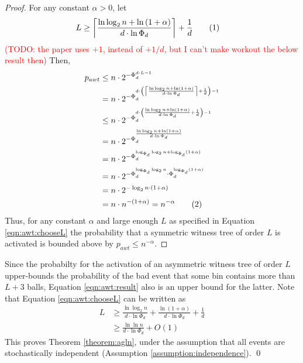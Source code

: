 \documentclass[a4paper,12pt]{article}
\newcommand\todo[1]{\textcolor{red}{(TODO: #1)}}
\newcommand\numberthis{\addtocounter{equation}{1}\tag{\theequation}}
\newcommand\neqn[1]{\numberthis\label{eqn:#1}}
\begin{document}
\begin{proof}
For any constant $\alpha > 0$, let 
\begin{align*}
L &\geq \left\lceil{\frac{\ln\log_2 n + \ln\left(1+\alpha\right)}{d\cdot \ln \Phi_d}}\right\rceil+\frac{1}{d} \neqn{awt:chooseL}
\end{align*}
\todo{the paper uses $+1$, instead of $+1/d$, but I can't make workout the below result then} 
Then, 
\begin{align*}
p_{awt} &\leq n \cdot 2^{-\Phi_d^{d\cdot L -1}} \\
        &= n \cdot 2^{-\Phi_d^{d\cdot \left(\left\lceil{\frac{\ln\log_2 n + \ln\left(1+\alpha\right)}{d\cdot \ln \Phi_d}}\right\rceil+\frac{1}{d}\right) -1}} \\
        &\leq n \cdot 2^{-\Phi_d^{d\cdot \left({\frac{\ln\log_2 n + \ln\left(1+\alpha\right)}{d\cdot \ln \Phi_d}}+\frac{1}{d}\right) -1}} \\
        &= n \cdot 2^{-\Phi_d^{{\frac{\ln\log_2 n + \ln\left(1+\alpha\right)}{d\cdot \ln \Phi_d}}}} \\
        &= n \cdot 2^{-\Phi_d^{\log_{\Phi_d}\log_2 n + \log_{\Phi_d}\left(1+\alpha\right)}} \\
         &= n \cdot 2^{-\Phi_d^{\log_{\Phi_d}\log_2 n}\cdot \Phi_d^{ \log_{\Phi_d}\left(1+\alpha\right)}} \\
         &= n \cdot 2^{-\log_2 n \cdot\left(1+\alpha\right)} \\
         &= n \cdot n ^{-(1+\alpha)} = n^{-\alpha} \neqn{awt:result}
\end{align*}
Thus, for any constant $\alpha$ and large enough $L$ as specified in Equation \ref{eqn:awt:chooseL} the probability that a symmetric witness tree of order $L$ is activated is bounded above by $p_{awt }\leq n^{-\alpha}$.
\end{proof}

Since the probabilty for the activation of an asymmetric witness tree of order $L$ upper-bounds the probability of the bad event that some bin contains more than $L+3$ balls, Equation \ref{eqn:awt:result} also is an upper bound for the latter. Note that Equation \ref{eqn:awt:chooseL} can be written as
\begin{align*}
L &\geq \frac{\ln\log_2 n}{d\cdot \ln \Phi_d} + \frac{\ln\left(1+\alpha\right)}{d\cdot \ln \Phi_d} + \frac{1}{d}\\
  &\geq \frac{\ln\ln n}{d\cdot \ln \Phi_d} + O\left(1\right)
\end{align*}
This proves Theorem \ref{theorem:agln}, under the assumption that all events are stochastically independent (Assumption \ref{assumption:independence}). \qed
\end{document}
